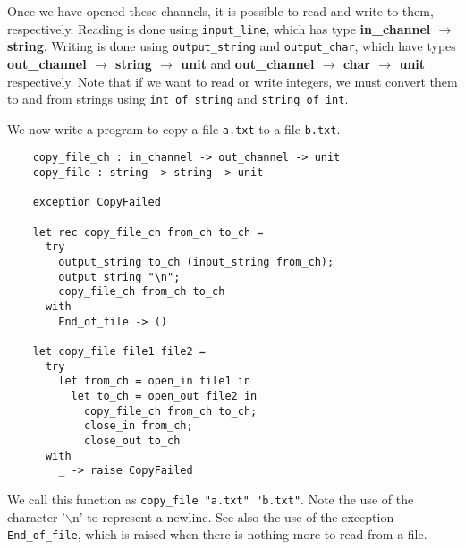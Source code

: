 \documentclass[12pt]{article}
\begin{document}
Once we have opened these channels, it is possible to read and write to them, respectively. Reading is done using \texttt{input\_line},
which has type \textbf{in\_channel $\rightarrow$ string}. Writing is done using \texttt{output\_string} and \texttt{output\_char},
which have types \textbf{out\_channel $\rightarrow$ string $\rightarrow$ unit} and \textbf{out\_channel $\rightarrow$ char $\rightarrow$ unit} respectively. Note that if
we want to read or write integers, we must convert them to and from strings using \texttt{int\_of\_string} and \texttt{string\_of\_int}.

We now write a program to copy a file \texttt{a.txt} to a file \texttt{b.txt}.
\begin{lstlisting}
    copy_file_ch : in_channel -> out_channel -> unit
    copy_file : string -> string -> unit

    exception CopyFailed

    let rec copy_file_ch from_ch to_ch =
      try
        output_string to_ch (input_string from_ch);
        output_string "\n";
        copy_file_ch from_ch to_ch
      with
        End_of_file -> ()

    let copy_file file1 file2 =
      try
        let from_ch = open_in file1 in
          let to_ch = open_out file2 in
            copy_file_ch from_ch to_ch;
            close_in from_ch;
            close_out to_ch
      with
        _ -> raise CopyFailed
\end{lstlisting}
We call this function as \texttt{copy\_file "a.txt" "b.txt"}. Note the use of the character '$\backslash$n' to represent
a newline. See also the use of the exception \texttt{End\_of\_file}, which is raised when there is nothing more to
read from a file.
\end{document}
